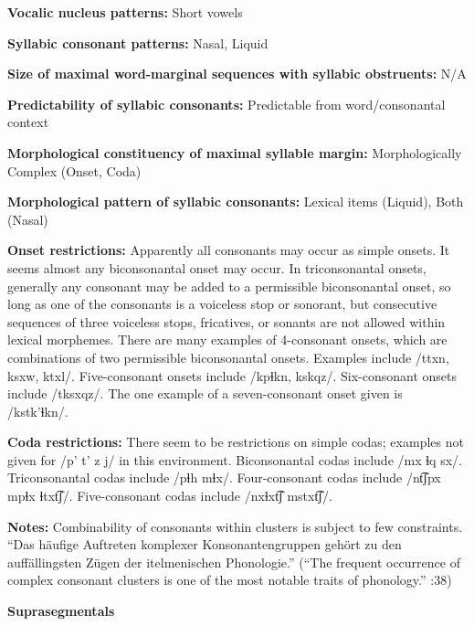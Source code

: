 \textbf{Vocalic nucleus patterns:} Short vowels



\textbf{Syllabic consonant patterns:} Nasal, Liquid



\textbf{Size of maximal word{}-marginal sequences with syllabic obstruents:} N/A



\textbf{Predictability of syllabic consonants:} Predictable from word/consonantal context



\textbf{Morphological constituency of maximal syllable margin:} Morphologically Complex (Onset, Coda)



\textbf{Morphological pattern of syllabic consonants:} Lexical items (Liquid), Both (Nasal)



\textbf{Onset restrictions:} Apparently all consonants may occur as simple onsets. It seems almost any biconsonantal onset may occur. In triconsonantal onsets, generally any consonant may be added to a permissible biconsonantal onset, so long as one of the consonants is a voiceless stop or sonorant, but consecutive sequences of three voiceless stops, fricatives, or sonants are not allowed within lexical morphemes. There are many examples of 4-consonant onsets, which are combinations of two permissible biconsonantal onsets. Examples include /ttxn, ksxw, ktxl/. Five-consonant onsets include /kpɬkn, kskqz/. Six-consonant onsets include /tksxqz/. The one example of a seven-consonant onset given is /kstk’ɬkn/.



\textbf{Coda restrictions:} There seem to be restrictions on simple codas; examples not given for /p’ t’ z j/ in this environment. Biconsonantal codas include /mx ɬq sx/. Triconsonantal codas include /pɬh mɬx/. Four-consonant codas include /nt͡ʃpx mpɬx ɬtxt͡ʃ/. Five-consonant codas include /nxɬxt͡ʃ mstxt͡ʃ/.



\textbf{Notes:} Combinability of consonants within clusters is subject to few constraints. “Das häufige Auftreten komplexer Konsonantengruppen gehört zu den auffällingsten Zügen der itelmenischen Phonologie.” (“The frequent occurrence of complex consonant clusters is one of the most notable traits of  phonology.” \citealt{GeorgVolodin1999}:38)



\textbf{Suprasegmentals}



